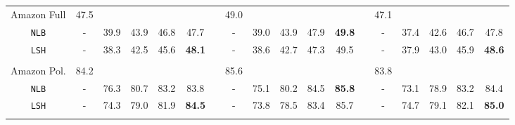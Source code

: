 \begin{table}[h]
{\begin{tabular}{@{}lcccccrcccccrccccc@{}}
            Amazon Full & 47.5 &&&&&& 49.0 &&&&&& 47.1\\
              \multicolumn{1}{c}{\texttt{NLB}}
                &-& 39.9 & 43.9 & 46.8 & 47.7 &
                &-& 39.0 & 43.9 & 47.9 & \textbf{49.8} &
                &-& 37.4 & 42.6 & 46.7 & 47.8\\
              \multicolumn{1}{c}{\texttt{LSH}}
                &-& 38.3 & 42.5 & 45.6 & \textbf{48.1} &
                &-& 38.6 & 42.7 & 47.3 & 49.5 &
                &-& 37.9 & 43.0 & 45.9 & \textbf{48.6}\\\\

            Amazon Pol. & 84.2 &&&&&& 85.6 &&&&&& 83.8\\
              \multicolumn{1}{c}{\texttt{NLB}}
                &-& 76.3 & 80.7 & 83.2 & 83.8 &
                &-& 75.1 & 80.2 & 84.5 & \textbf{85.8} &
                &-& 73.1 & 78.9 & 83.2 & 84.4\\
              \multicolumn{1}{c}{\texttt{LSH}}
                &-& 74.3 & 79.0 & 81.9 & \textbf{84.5} &
                &-& 73.8 & 78.5 & 83.4 & 85.7 &
                &-& 74.7 & 79.1 & 82.1 & \textbf{85.0}\\\\


\end{tabular}}
\end{table}
